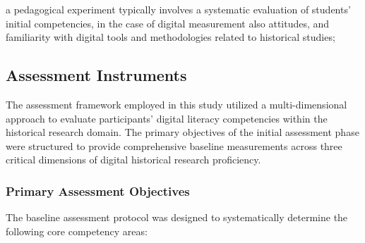  a pedagogical experiment typically involves a systematic evaluation of students' initial competencies, in the case of digital measurement also attitudes, and familiarity with digital tools and methodologies related to historical studies; 

\subsection{Assessment Instruments}

The assessment framework employed in this study utilized a multi-dimensional approach to evaluate participants' digital literacy competencies within the historical research domain. The primary objectives of the initial assessment phase were structured to provide comprehensive baseline measurements across three critical dimensions of digital historical research proficiency.

\subsubsection{Primary Assessment Objectives}

The baseline assessment protocol was designed to systematically determine the following core competency areas:

